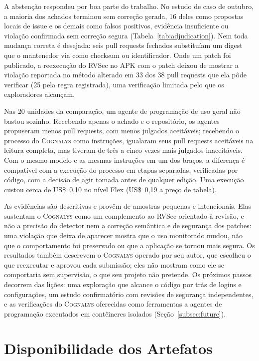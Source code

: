 \documentclass[conference]{IEEEtran}
\newcommand{\system}{\textsc{Cognalys}}
\begin{document}
A abstenção respondeu por boa parte do trabalho. No estudo de caso de outubro, a maioria
dos achados terminou sem correção gerada, 16 deles como propostas locais de issue e os
demais como falsos positivos, evidência insuficiente ou violação confirmada sem correção
segura (Tabela~\ref{tab:adjudication}). Nem toda mudança correta é desejada: seis pull
requests fechados substituíam um digest que o mantenedor via como checksum ou
identificador. Onde um patch foi publicado, a reexecução do RVSec no APK
com o patch deixou de mostrar a violação reportada no método alterado em 33 dos 38 pull
requests que ela pôde verificar (25 pela regra registrada), uma verificação limitada pelo
que os exploradores alcançam.

Nas 20 unidades da comparação, um agente de programação de uso geral não bastou sozinho. Recebendo apenas o achado e o
repositório, os agentes propuseram menos pull requests, com menos julgados aceitáveis;
recebendo o processo do \system{} como instruções, igualaram seus pull requests
aceitáveis na leitura completa, mas tiveram de três a cinco vezes mais julgados inaceitáveis.
Com o mesmo modelo e as mesmas instruções em um dos braços, a diferença é compatível com a
execução do processo em etapas separadas, verificadas por código, com a decisão de agir
tomada antes de qualquer edição. Uma execução custou cerca de US\$~0,10 no nível Flex
(US\$~0,19 a preço de tabela).

As evidências são descritivas e provêm de amostras pequenas e intencionais. Elas
sustentam o \system{} como um complemento ao RVSec orientado à revisão, e não a precisão
do detector nem a correção semântica e de segurança dos patches: uma violação que deixa
de aparecer mostra que o uso monitorado mudou, não que o comportamento foi preservado ou
que a aplicação se tornou mais segura. Os resultados também descrevem o \system{} operado
por seu autor, que escolheu o que reexecutar e aprovou cada submissão; eles não mostram
como ele se comportaria sem supervisão, o que seu projeto não pretende. Os próximos
passos decorrem das lições: uma exploração que alcance o código por trás de logins e
configurações, um estudo confirmatório com revisões de segurança independentes, e as
verificações do \system{} oferecidas como ferramentas a agentes de programação executados
em contêineres isolados (Seção~\ref{subsec:future}).

\section*{Disponibilidade dos Artefatos}
\end{document}
